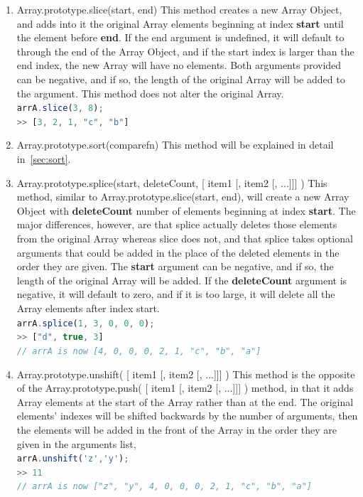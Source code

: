 \documentclass[a4paper,11pt,twoside]{report}
\def\jsinline{\lstinline[language=JavaScript, basicstyle=\small]}
\begin{document}
\begin{enumerate}
\item Array.prototype.slice(start, end) \newline
This method creates a new Array Object, and adds into it the original Array elements beginning at index \textbf{start} until the element before \textbf{end}. If the end argument is undefined, it will default to through the end of the Array Object, and if the start index is larger than the end index, the new Array will have no elements. Both arguments provided can be negative, and if so, the length of the original Array will be added to the argument. This method does not alter the original Array.\\
\jsinline|arrA.slice(3, 8);|\\
\jsinline|>> [3, 2, 1, "c", "b"]|

\item Array.prototype.sort(comparefn) \newline
This method will be explained in detail in~\ref{sec:sort}.

\item Array.prototype.splice(start, deleteCount, [ item1 [, item2 [, ...]]] ) \newline
This method, similar to Array.prototype.slice(start, end), will create a new Array Object with \textbf{deleteCount} number of elements beginning at index \textbf{start}. The major differences, however, are that splice actually deletes those elements from the original Array whereas slice does not, and that splice takes optional arguments that could be added in the place of the deleted elements in the order they are given. The \textbf{start} argument can be negative, and if so, the length of the original Array will be added. If the \textbf{deleteCount} argument is negative, it will default to zero, and if it is too large, it will delete all the Array elements after index start. \\
\jsinline|arrA.splice(1, 3, 0, 0, 0);|\\
\jsinline|>> ["d", true, 3]| \\
\jsinline|// arrA is now [4, 0, 0, 0, 2, 1, "c", "b", "a"]|

\item Array.prototype.unshift( [ item1 [, item2 [, ...]]] ) \newline
This method is the opposite of the Array.prototype.push( [ item1 [, item2 [, ...]]] ) method, in that it adds Array elements at the start of the Array rather than at the end. The original elements' indexes will be shifted backwards by the number of arguments, then the elements will be added in the front of the Array in the order they are given in the arguments list, \\
\jsinline|arrA.unshift('z','y');|\\
\jsinline|>> 11| \\
\jsinline|// arrA is now ["z", "y", 4, 0, 0, 0, 2, 1, "c", "b", "a"]|


\end{enumerate}
\end{document}
